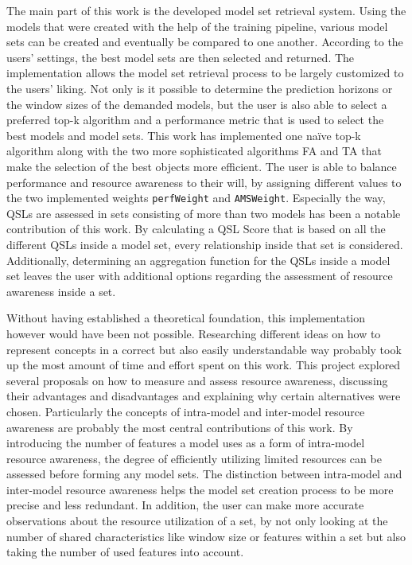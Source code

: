 The main part of this work is the developed model set retrieval system. Using the models that were created with the help of the training pipeline, various model sets can be created and eventually be compared to one another. According to the users’ settings, the best model sets are then selected and returned. The implementation allows the model set retrieval process to be largely customized to the users’ liking. Not only is it possible to determine the prediction horizons or the window sizes of the demanded models, but the user is also able to select a preferred top-k algorithm and a performance metric that is used to select the best models and model sets. This work has implemented one naïve top-k algorithm along with the two more sophisticated algorithms FA and TA that make the selection of the best objects more efficient. The user is able to balance performance and resource awareness to their will, by assigning different values to the two implemented weights \texttt{perfWeight} and \texttt{AMSWeight}. Especially the way, QSLs are assessed in sets consisting of more than two models has been a notable contribution of this work. By calculating a QSL Score that is based on all the different QSLs inside a model set, every relationship inside that set is considered. Additionally, determining an aggregation function for the QSLs inside a model set leaves the user with additional options regarding the assessment of resource awareness inside a set. 

Without having established a theoretical foundation, this implementation however would have been not possible. Researching different ideas on how to represent concepts in a correct but also easily understandable way probably took up the most amount of time and effort spent on this work. This project explored several proposals on how to measure and assess resource awareness, discussing their advantages and disadvantages and explaining why certain alternatives were chosen. Particularly the concepts of intra-model and inter-model resource awareness are probably the most central contributions of this work. By introducing the number of features a model uses as a form of intra-model resource awareness, the degree of efficiently utilizing limited resources can be assessed before forming any model sets. The distinction between intra-model and inter-model resource awareness helps the model set creation process to be more precise and less redundant. In addition, the user can make more accurate observations about the resource utilization of a set, by not only looking at the number of shared characteristics like window size or features within a set but also taking the number of used features into account.

